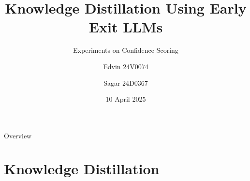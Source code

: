 \documentclass[aspectratio=169,xcolor=dvipsnames]{beamer}
\title{Knowledge Distillation Using Early Exit LLMs}
\subtitle{Experiments on Confidence Scoring}
\author{ Edvin 24V0074 \and Sagar 24D0367 }
\institute
{
    CS 769 \\
    Optimization in Machine Learning %
}
\date{10 April 2025} %
\begin{document}
\begin{frame}
    \titlepage
\end{frame}

\begin{frame}{Overview}
    \tableofcontents
\end{frame}

\section{Knowledge Distillation}
\end{document}
